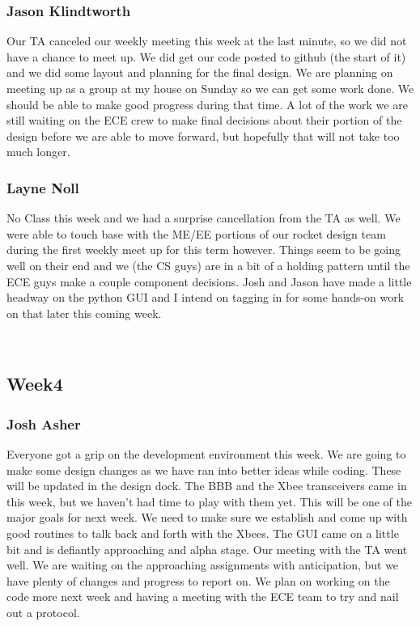 \documentclass[10pt,draftclsnofoot,onecolumn]{IEEEtran}
\begin{document}
\subsubsection{Jason Klindtworth}
 Our TA canceled our weekly meeting this week at the last minute, so we did not have a chance to meet up. We did get our code posted to github (the start of it) and we did some layout and planning for the final design. We are planning on meeting up as a group at my house on Sunday so we can get some work done. We should be able to make good progress during that time. A lot of the work we are still waiting on the ECE crew to make final decisions about their portion of the design before we are able to move forward, but hopefully that will not take too much longer. \par

\subsubsection{Layne Noll}
No Class this week and we had a surprise cancellation from the TA as well. We were able to touch base with the ME/EE portions of our rocket design team during the first weekly meet up for this term however. Things seem to be going well on their end and we (the CS guys) are in a bit of a holding pattern until the ECE guys make a couple component decisions. Josh and Jason have made a little headway on the python GUI and I intend on tagging in for some hands-on work on that later this coming week.  \par\

\subsection{Week4}
\subsubsection{Josh Asher}
 Everyone got a grip on the development environment this week. We are going to make some design changes as we have ran into better ideas while coding. These will be updated in the design dock. The BBB and the Xbee transceivers came in this week, but we haven't had time to play with them yet. This will be one of the major goals for next week. We need to make sure we establish and come up with good routines to talk back and forth with the Xbees. The GUI came on a little bit and is defiantly approaching and alpha stage. Our meeting with the TA went well. We are waiting on the approaching assignments with anticipation, but we have plenty of changes and progress to report on. We plan on working on the code more next week and having a meeting with the ECE team to try and nail out a protocol. \par
\end{document}
